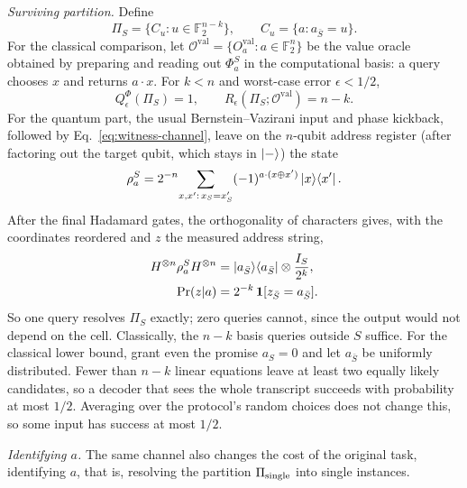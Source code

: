 \documentclass[
  aps,
  pra,
  reprint,
  nofootinbib
]{revtex4-2}
\begin{document}
\emph{Surviving partition.} Define
\begin{equation}
 \Pi_S=\{C_u:u\in\mathbb F_2^{n-k}\},\qquad
 C_u=\{a:a_{\bar S}=u\}.
 \label{eq:surviving-partition}
\end{equation}
For the classical comparison, let \(\mathcal O^{\mathrm{val}}=\{O_a^{\mathrm{val}}:a\in
\mathbb F_2^n\}\) be the value oracle obtained by preparing and reading out
\(\Phi_a^S\) in the computational basis: a query chooses \(x\) and returns
\(a\cdot x\). For \(k<n\) and worst-case error \(\epsilon<1/2\),
\begin{equation}
 Q_\epsilon^{\Phi}(\Pi_S)=1,\qquad
 R_\epsilon(\Pi_S;\mathcal O^{\mathrm{val}})=n-k.
 \label{eq:partition-speedup}
\end{equation}
For the quantum part, the usual Bernstein--Vazirani input and phase kickback,
followed by Eq.~\eqref{eq:witness-channel}, leave on the \(n\)-qubit address
register (after factoring out the target qubit, which stays in \(\ket-\)) the
state
\begin{equation}
 \rho_a^S=2^{-n}\!\sum_{x,x':\,x_S=x'_S}
 (-1)^{a\cdot(x\oplus x')}\ket x\!\bra{x'}.
 \label{eq:reduced-bv}
\end{equation}
After the final Hadamard gates, the orthogonality of characters gives, with
the coordinates reordered and \(z\) the measured address string,
\begin{equation}
\begin{aligned}
 H^{\otimes n}\rho_a^S H^{\otimes n}
 &=\ket{a_{\bar S}}\!\bra{a_{\bar S}}\otimes\frac{I_S}{2^k},\\
 \Pr(z|a)&=2^{-k}\,\mathbf 1[z_{\bar S}=a_{\bar S}].
\end{aligned}
 \label{eq:leaky-distribution}
\end{equation}
So one query resolves \(\Pi_S\) exactly; zero queries cannot, since the output
would not depend on the cell. Classically, the \(n-k\) basis queries outside
\(S\) suffice. For the classical lower bound, grant even the promise
\(a_S=0\) and let \(a_{\bar S}\) be uniformly distributed. Fewer than \(n-k\)
linear equations leave at least two equally likely candidates, so a decoder
that sees the whole transcript succeeds with probability at most \(1/2\).
Averaging over the protocol's random choices does not change this, so some
input has success at most \(1/2\).

\emph{Identifying \(a\).} The same channel also changes the cost of the
original task, identifying \(a\), that is, resolving the partition
\(\Pi_{\rm single}\) into single instances.
\end{document}
